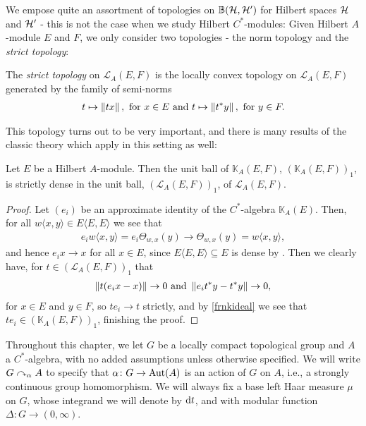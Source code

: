 We empose quite an assortment of topologies on $\mathbb{B}(\mathcal{H},\mathcal{H}')$ for Hilbert spaces $\mathcal{H}$ and $\mathcal{H}'$ - this is not the case when we study Hilbert $C^*$-modules: Given Hilbert $A$-module $E$ and $F$, we only consider two topologies - the norm topology and the \emph{strict topology}:
\begin{definition}
	The \emph{strict topology} on $\mathcal{L}_A(E,F)$ is the locally convex topology on $\mathcal{L}_A(E,F)$ generated by the family of semi-norms 
	\begin{align*}
		t \mapsto \left\lVert tx\right\rVert, \text{ for } x \in E \text{ and }		t \mapsto \left\lVert t^*y \right\rVert, \text{ for } y \in F.
	\end{align*}
\end{definition}
This topology turns out to be very important, and there is many results of the classic theory which apply in this setting as well:
\begin{proposition}
	Let $E$ be a Hilbert $A$-module. Then the unit ball of $\mathbb{K}_A(E,F)$, $(\mathbb{K}_A(E,F))_1$, is strictly dense in the unit ball, $(\mathcal{L}_A(E,F))_1$, of $\mathcal{L}_A(E,F)$.
\end{proposition}
\begin{proof}
	Let $(e_i)$ be an approximate identity of the $C^*$-algebra $\mathbb{K}_A(E)$. Then, for all $w\langle x,y \rangle \in E\langle E,E \rangle$ we see that
	\begin{align*}
		e_i w\langle x,y \rangle = e_i \Theta_{w,x}(y) \to \Theta_{w,x}(y) = w \langle x,y\rangle,
	\end{align*}
	and hence $e_i x \to x$ for all $x \in E$, since $E\langle E,E\rangle \subseteq E$ is dense by . Then we clearly have, for $t \in (\mathcal{L}_A(E,F))_1$ that
	\begin{align*}
		\left\lVert t(e_ix-x)\right\rVert \to 0 \text{  and  } \left\lVert e_it^*y-t^*y\right\rVert \to 0,
	\end{align*}
	for $x \in E$ and $y \in F$, so $te_i \to t$ strictly, and by \ref{frnkideal} we see that $te_i \in (\mathbb{K}_A(E,F))_1$, finishing the proof.
\end{proof}








Throughout this chapter, we let $G$ be a locally compact topological group and $A$ a $C^*$-algebra, with no added assumptions unless otherwise specified. We will write $G \curvearrowright_\alpha A$ to specify that $\alpha \colon G \to \operatorname{Aut}(A)$ is an action of $G$ on $A$, i.e., a strongly continuous group homomorphism. We will always fix a base left Haar measure $\mu$ on $G$, whose integrand we will denote by $\mathrm{d} t$, and with modular function $\Delta \colon G \to (0,\infty)$.


